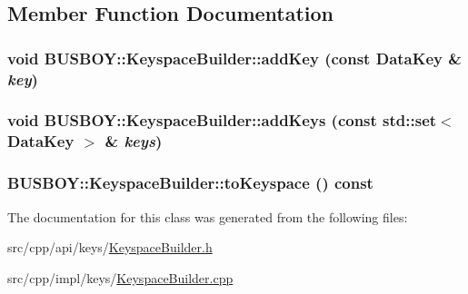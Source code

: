 \subsection{Member Function Documentation}
\hypertarget{classBUSBOY_1_1KeyspaceBuilder_afa598f7a0b1b7cc1cf02df0e4e5a9e13}{
\subsubsection[{addKey}]{\setlength{\rightskip}{0pt plus 5cm}void BUSBOY::KeyspaceBuilder::addKey (const {\bf DataKey} \& {\em key})}}
\label{classBUSBOY_1_1KeyspaceBuilder_afa598f7a0b1b7cc1cf02df0e4e5a9e13}
\hypertarget{classBUSBOY_1_1KeyspaceBuilder_ab4e1f462bcb554829e3d6f2f829b728f}{
\subsubsection[{addKeys}]{\setlength{\rightskip}{0pt plus 5cm}void BUSBOY::KeyspaceBuilder::addKeys (const std::set$<$ {\bf DataKey} $>$ \& {\em keys})}}
\label{classBUSBOY_1_1KeyspaceBuilder_ab4e1f462bcb554829e3d6f2f829b728f}
\hypertarget{classBUSBOY_1_1KeyspaceBuilder_a26afabca05fdb23c5e3830eb4cb5a150}{
\subsubsection[{toKeyspace}]{ BUSBOY::KeyspaceBuilder::toKeyspace () const}}
\label{classBUSBOY_1_1KeyspaceBuilder_a26afabca05fdb23c5e3830eb4cb5a150}


The documentation for this class was generated from the following files:\begin{DoxyCompactItemize}
\item 
src/cpp/api/keys/\hyperlink{KeyspaceBuilder_8h}{KeyspaceBuilder.h}\item 
src/cpp/impl/keys/\hyperlink{KeyspaceBuilder_8cpp}{KeyspaceBuilder.cpp}\end{DoxyCompactItemize}
